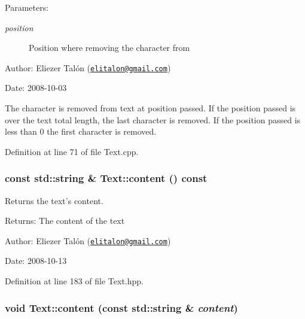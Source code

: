 \begin{Desc}
\item[Parameters:]
\begin{description}
\item[{\em position}]Position where removing the character from\end{description}
\end{Desc}
\begin{Desc}
\item[Author:]Eliezer Talón (\href{mailto:elitalon@gmail.com}{\tt elitalon@gmail.com}) \end{Desc}
\begin{Desc}
\item[Date:]2008-10-03\end{Desc}
The character is removed from text at position passed. If the position passed is over the text total length, the last character is removed. If the position passed is less than 0 the first character is removed. 

Definition at line 71 of file Text.cpp.\hypertarget{class_text_8b6ac381338c5b3f719600b5f9be222c}{
\subsubsection[content]{\setlength{\rightskip}{0pt plus 5cm}const std::string \& Text::content () const}}
\label{class_text_8b6ac381338c5b3f719600b5f9be222c}


Returns the text's content. 

\begin{Desc}
\item[Returns:]The content of the text\end{Desc}
\begin{Desc}
\item[Author:]Eliezer Talón (\href{mailto:elitalon@gmail.com}{\tt elitalon@gmail.com}) \end{Desc}
\begin{Desc}
\item[Date:]2008-10-13 \end{Desc}


Definition at line 183 of file Text.hpp.\hypertarget{class_text_eca454f28010b6b3e7bd0d771b8eaeb2}{
\subsubsection[content]{\setlength{\rightskip}{0pt plus 5cm}void Text::content (const std::string \& {\em content})}}
\label{class_text_eca454f28010b6b3e7bd0d771b8eaeb2}


